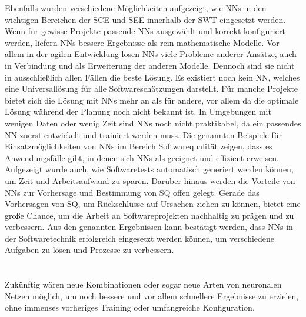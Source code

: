 Ebenfalls wurden verschiedene Möglichkeiten aufgezeigt, wie NNs in den wichtigen Bereichen der SCE und SEE innerhalb der SWT eingesetzt werden. Wenn für gewisse Projekte passende NNs ausgewählt und korrekt konfiguriert werden, liefern NNs bessere Ergebnisse als rein mathematische Modelle. Vor allem in der agilen Entwicklung lösen NNs viele Probleme anderer Ansätze, auch in Verbindung und als Erweiterung der anderen Modelle.
Dennoch sind sie nicht in ausschließlich allen Fällen die beste Lösung. Es existiert noch kein NN, welches eine Universallösung für alle Softwareschätzungen darstellt. Für manche Projekte bietet sich die Lösung mit NNs mehr an als für andere, vor allem da die optimale Lösung während der Planung noch nicht bekannt ist. In Umgebungen mit wenigen Daten oder wenig Zeit sind NNs noch nicht praktikabel, da ein passendes NN zuerst entwickelt und trainiert werden muss.
Die genannten Beispiele für Einsatzmöglichkeiten von NNs im Bereich Softwarequalität zeigen, dass es Anwendungsfälle gibt, in denen sich NNs als geeignet und effizient erweisen. Aufgezeigt wurde auch, wie Softwaretests automatisch generiert werden können, um Zeit und Arbeitsaufwand zu sparen. Darüber hinaus werden die Vorteile von NNs zur Vorhersage und Bestimmung von SQ offen gelegt. Gerade das Vorhersagen von SQ, um Rückschlüsse auf Ursachen ziehen zu können, bietet eine große Chance, um die Arbeit an Softwareprojekten nachhaltig zu prägen und zu verbessern. Aus den genannten Ergebnissen kann bestätigt werden, dass NNs in der Softwaretechnik erfolgreich eingesetzt werden können, um verschiedene Aufgaben zu lösen und Prozesse zu verbessern.
\\
\\
\\
Zukünftig wären neue Kombinationen oder sogar neue Arten von neuronalen Netzen möglich, um noch bessere und vor allem schnellere Ergebnisse zu erzielen, ohne immenses vorheriges Training oder umfangreiche Konfiguration.
